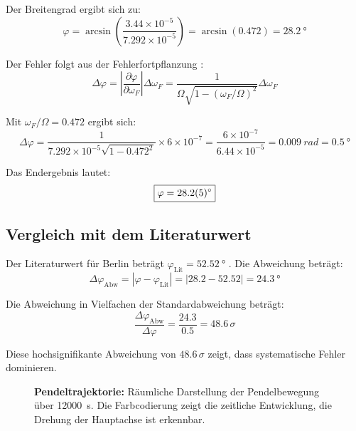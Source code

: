 \documentclass[a4paper,12pt]{article}
\begin{document}
Der Breitengrad ergibt sich zu:
\begin{equation}
\varphi = \arcsin\left(\frac{3.44\times10^{-5}}{7.292\times10^{-5}}\right) = \arcsin(0.472) = \qty{28.2}{\degree}
\end{equation}

Der Fehler folgt aus der Fehlerfortpflanzung \cite[Gl.~14, S.~14]{mallick2025}:
\begin{equation}
\Delta\varphi = \left|\frac{\partial\varphi}{\partial\omega_F}\right|\Delta\omega_F = \frac{1}{\Omega\sqrt{1-(\omega_F/\Omega)^2}}\Delta\omega_F
\end{equation}

Mit $\omega_F/\Omega = 0.472$ ergibt sich:
\begin{equation}
\Delta\varphi = \frac{1}{7.292\times10^{-5}\sqrt{1-0.472^2}} \times 6\times10^{-7} = \frac{6\times10^{-7}}{6.44\times10^{-5}} = \qty{0.009}{rad} = \qty{0.5}{\degree}
\end{equation}

Das Endergebnis lautet:
\begin{equation}
\boxed{\varphi = \qty{28.2 +- 0.5}{\degree}}
\end{equation}

\subsection{Vergleich mit dem Literaturwert}

Der Literaturwert für Berlin beträgt $\varphi_{\text{Lit}} = \qty{52.52}{\degree}$ \cite[S.~412]{demtroeder2021}. Die Abweichung beträgt:
\begin{equation}
\Delta\varphi_{\text{Abw}} = |\varphi - \varphi_{\text{Lit}}| = |28.2 - 52.52| = \qty{24.3}{\degree}
\end{equation}

Die Abweichung in Vielfachen der Standardabweichung beträgt:
\begin{equation}
\frac{\Delta\varphi_{\text{Abw}}}{\Delta\varphi} = \frac{24.3}{0.5} = 48.6\,\sigma
\end{equation}

Diese hochsignifikante Abweichung von $\num{48.6}\,\sigma$ zeigt, dass systematische Fehler dominieren.

\begin{figure}[h]
\centering
{}
\caption{\textbf{Pendeltrajektorie:} Räumliche Darstellung der Pendelbewegung über \qty{12000}{s}. Die Farbcodierung zeigt die zeitliche Entwicklung, die Drehung der Hauptachse ist erkennbar.}
\label{fig:trajektorie}
\end{figure}
\end{document}
